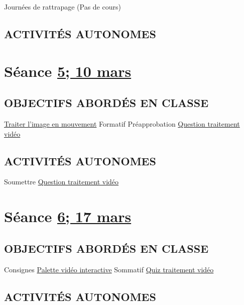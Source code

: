 \documentclass[
  french,
]{book}
\begin{document}
Journées de rattrapage (Pas de cours)

\hypertarget{activituxe9s-autonomes-4}{%
\subsection{ACTIVITÉS AUTONOMES}\label{activituxe9s-autonomes-4}}

\hypertarget{semaine_6}{%
\section{\texorpdfstring{Séance \protect\hyperlink{semaine_6}{5; 10 mars}}{Séance 5; 10 mars}}\label{semaine_6}}

\hypertarget{objectifs-aborduxe9s-en-classe-5}{%
\subsection{OBJECTIFS ABORDÉS EN CLASSE}\label{objectifs-aborduxe9s-en-classe-5}}

\protect\hyperlink{traiter}{Traiter l'image en mouvement}
Formatif Préapprobation \protect\hyperlink{sommatif_2}{Question traitement vidéo}

\hypertarget{activituxe9s-autonomes-5}{%
\subsection{ACTIVITÉS AUTONOMES}\label{activituxe9s-autonomes-5}}

Soumettre \protect\hyperlink{sommatif_2}{Question traitement vidéo}

\hypertarget{semaine_7}{%
\section{\texorpdfstring{Séance \protect\hyperlink{semaine_7}{6; 17 mars}}{Séance 6; 17 mars}}\label{semaine_7}}

\hypertarget{objectifs-aborduxe9s-en-classe-6}{%
\subsection{OBJECTIFS ABORDÉS EN CLASSE}\label{objectifs-aborduxe9s-en-classe-6}}

Consignes \protect\hyperlink{sommatif_4}{Palette vidéo interactive}
Sommatif \protect\hyperlink{sommatif_3}{Quiz traitement vidéo}

\hypertarget{activituxe9s-autonomes-6}{%
\subsection{ACTIVITÉS AUTONOMES}\label{activituxe9s-autonomes-6}}
\end{document}
